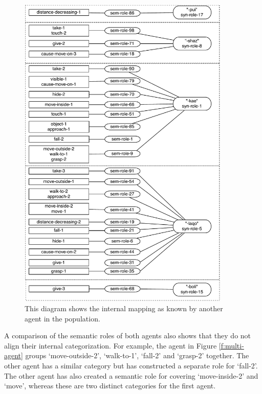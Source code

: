 \begin{figure}[p]
\centerline{\includegraphics[width=0.9\textwidth]{Chapter4/figs/multi-agent2}}
  \caption[Syntactic roles: the mapping for a single agent (2)]{This diagram shows the internal mapping as known by another agent in the population.}
   \label{f:multi-agent2}
\end{figure}

A comparison of the semantic roles of both agents also shows that they do not align their internal categorization. For example, the agent in Figure \ref{f:multi-agent} groups `move-outside-2', `walk-to-1', `fall-2' and `grasp-2' together. The other agent has a similar category but has constructed a separate role for `fall-2'. The other agent has also created a semantic role for covering `move-inside-2' and `move', whereas these are two distinct categories for the first agent.


